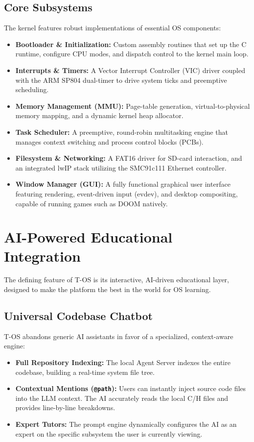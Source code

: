 \documentclass[a4paper,11pt]{article}
\begin{document}
\subsection{Core Subsystems}
The kernel features robust implementations of essential OS components:
\begin{itemize}
    \item \textbf{Bootloader \& Initialization:} Custom assembly routines that set up the C runtime, configure CPU modes, and dispatch control to the kernel main loop.
    \item \textbf{Interrupts \& Timers:} A Vector Interrupt Controller (VIC) driver coupled with the ARM SP804 dual-timer to drive system ticks and preemptive scheduling.
    \item \textbf{Memory Management (MMU):} Page-table generation, virtual-to-physical memory mapping, and a dynamic kernel heap allocator.
    \item \textbf{Task Scheduler:} A preemptive, round-robin multitasking engine that manages context switching and process control blocks (PCBs).
    \item \textbf{Filesystem \& Networking:} A FAT16 driver for SD-card interaction, and an integrated lwIP stack utilizing the SMC91c111 Ethernet controller.
    \item \textbf{Window Manager (GUI):} A fully functional graphical user interface featuring rendering, event-driven input (evdev), and desktop compositing, capable of running games such as DOOM natively.
\end{itemize}

\section{AI-Powered Educational Integration}
The defining feature of T-OS is its interactive, AI-driven educational layer, designed to make the platform the best in the world for OS learning.

\subsection{Universal Codebase Chatbot}
T-OS abandons generic AI assistants in favor of a specialized, context-aware engine:
\begin{itemize}
    \item \textbf{Full Repository Indexing:} The local Agent Server indexes the entire codebase, building a real-time system file tree.
    \item \textbf{Contextual Mentions (\texttt{@path}):} Users can instantly inject source code files into the LLM context. The AI accurately reads the local C/H files and provides line-by-line breakdowns.
    \item \textbf{Expert Tutors:} The prompt engine dynamically configures the AI as an expert on the specific subsystem the user is currently viewing.
\end{itemize}
\end{document}
